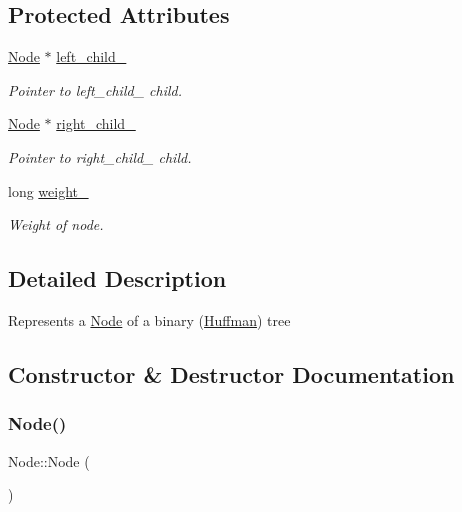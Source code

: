 \subsection*{Protected Attributes}
\begin{DoxyCompactItemize}
\item 
\mbox{\label{class_node_a5ee0db484771d8654c32e7863fba292e}} 
\hyperlink{class_node}{Node} $\ast$ \hyperlink{class_node_a5ee0db484771d8654c32e7863fba292e}{left\+\_\+child\+\_\+}
\begin{DoxyCompactList}\small\item\em Pointer to left\+\_\+child\+\_\+ child. \end{DoxyCompactList}\item 
\mbox{\label{class_node_abf180145dff7ffce95b3b39bfe24d2f6}} 
\hyperlink{class_node}{Node} $\ast$ \hyperlink{class_node_abf180145dff7ffce95b3b39bfe24d2f6}{right\+\_\+child\+\_\+}
\begin{DoxyCompactList}\small\item\em Pointer to right\+\_\+child\+\_\+ child. \end{DoxyCompactList}\item 
\mbox{\label{class_node_ae19ed1e78bfaf9ae1c33462d878116e2}} 
long \hyperlink{class_node_ae19ed1e78bfaf9ae1c33462d878116e2}{weight\+\_\+}
\begin{DoxyCompactList}\small\item\em Weight of node. \end{DoxyCompactList}\end{DoxyCompactItemize}


\subsection{Detailed Description}
Represents a \hyperlink{class_node}{Node} of a binary (\hyperlink{class_huffman}{Huffman}) tree 

\subsection{Constructor \& Destructor Documentation}
\mbox{\label{class_node_ad7a34779cad45d997bfd6d3d8043c75f}} 
\subsubsection{\texorpdfstring{Node()}{Node()}\hspace{0.1cm}{\footnotesize\ttfamily [1/2]}}
{\footnotesize\ttfamily Node\+::\+Node (\begin{DoxyParamCaption}{ }\end{DoxyParamCaption})}

